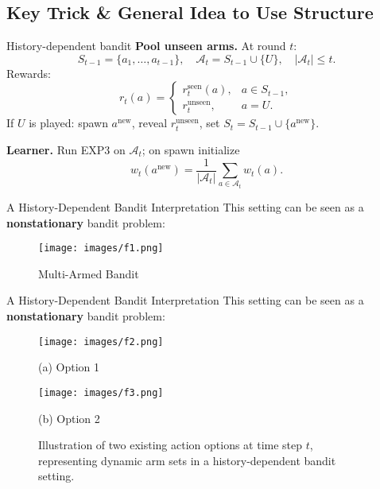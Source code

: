 \documentclass{beamer}
\begin{document}
\subsection{Key Trick \& General Idea to Use Structure}
\begin{frame}{History-dependent bandit}
    \small
    \textbf{Pool unseen arms.} At round $t$:
    \[
    S_{t-1}=\{a_1,\dots,a_{t-1}\},\quad
    \mathcal A_t = S_{t-1}\cup\{U\},\quad
    |\mathcal A_t|\le t.
    \]
    Rewards:
    \[
    r_t(a)=
    \begin{cases}
    r_t^{\text{seen}}(a), & a\in S_{t-1},\\
    r_t^{\text{unseen}}, & a=U.
    \end{cases}
    \]
    If $U$ is played: spawn $a^{\text{new}}$, reveal $r_t^{\text{unseen}}$, set $S_t=S_{t-1}\cup\{a^{\text{new}}\}$.
    
    \medskip
    \textbf{Learner.} Run EXP3 on $\mathcal A_t$; on spawn initialize
    \[
    w_t(a^{\text{new}})=\frac{1}{|\mathcal A_t|}\sum_{a\in\mathcal A_t}w_t(a).
    \]
\end{frame}



\begin{frame}{A History-Dependent Bandit Interpretation}
    This setting can be seen as a \textbf{nonstationary} bandit problem:

    \begin{figure}
        \centering
        \texttt{[image: images/f1.png]}
        \caption{Multi-Armed Bandit}
    \end{figure}
\end{frame}


\begin{frame}{A History-Dependent Bandit Interpretation}
    This setting can be seen as a \textbf{nonstationary} bandit problem:

    \begin{figure}
        \centering
        \begin{minipage}{0.48\linewidth}
            \centering
            \texttt{[image: images/f2.png]}
            \caption*{(a) Option 1}
        \end{minipage}
        \hfill
        \begin{minipage}{0.48\linewidth}
            \centering
            \texttt{[image: images/f3.png]}
            \caption*{(b) Option 2}
        \end{minipage}
        \caption{Illustration of two existing action options at time step \( t \), representing dynamic arm sets in a history-dependent bandit setting.}
    \end{figure}
\end{frame}
\end{document}
